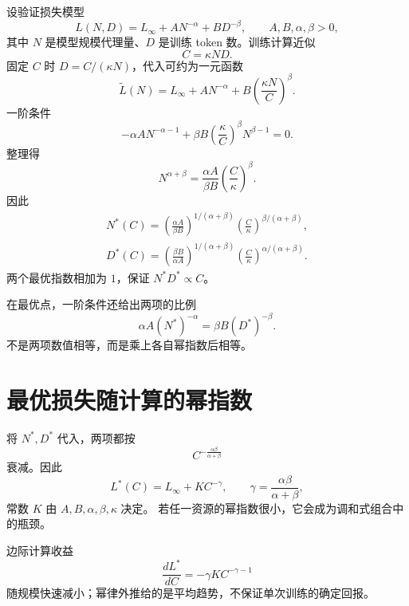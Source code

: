 \documentclass[11pt]{article}
\numberwithin{equation}{section}
\newcommand{\1}{\mathbf{1}}
\begin{document}
设验证损失模型
\begin{equation}
 L(N,D)=L_\infty+A N^{-\alpha}+B D^{-\beta},
 \qquad A,B,\alpha,\beta>0,
\end{equation}
其中 $N$ 是模型规模代理量、$D$ 是训练 token 数。训练计算近似
\begin{equation}
 C=\kappa ND.
\end{equation}
固定 $C$ 时 $D=C/(\kappa N)$，代入可约为一元函数
\begin{equation}
 \widetilde L(N)=L_\infty+A N^{-\alpha}
 +B\left(\frac{\kappa N}{C}\right)^\beta.
\end{equation}
一阶条件
\begin{equation}
 -\alpha A N^{-\alpha-1}
 +\beta B\left(\frac\kappa C\right)^\beta N^{\beta-1}=0.
\end{equation}
整理得
\begin{equation}
 N^{\alpha+\beta}
 =\frac{\alpha A}{\beta B}\left(\frac C\kappa\right)^\beta.
\end{equation}
因此
\begin{align}
 \boxed{N^*(C)=
 \left(\frac{\alpha A}{\beta B}\right)^{1/(\alpha+\beta)}
 \left(\frac C\kappa\right)^{\beta/(\alpha+\beta)},}\\
 \boxed{D^*(C)=
 \left(\frac{\beta B}{\alpha A}\right)^{1/(\alpha+\beta)}
 \left(\frac C\kappa\right)^{\alpha/(\alpha+\beta)}.}
\end{align}
两个最优指数相加为 $1$，保证 $N^*D^*\propto C$。

在最优点，一阶条件还给出两项的比例
\begin{equation}
 \alpha A(N^*)^{-\alpha}=\beta B(D^*)^{-\beta}.
\end{equation}
不是两项数值相等，而是乘上各自幂指数后相等。

\section{最优损失随计算的幂指数}

将 $N^*,D^*$ 代入，两项都按
\begin{equation}
 C^{-\frac{\alpha\beta}{\alpha+\beta}}
\end{equation}
衰减。因此
\begin{equation}
 L^*(C)=L_\infty+K C^{-\gamma},
 \qquad \gamma=\frac{\alpha\beta}{\alpha+\beta},
\end{equation}
常数 $K$ 由 $A,B,\alpha,\beta,\kappa$ 决定。
若任一资源的幂指数很小，它会成为调和式组合中的瓶颈。

边际计算收益
\begin{equation}
 \frac{dL^*}{dC}=-\gamma K C^{-\gamma-1}
\end{equation}
随规模快速减小；幂律外推给的是平均趋势，不保证单次训练的确定回报。
\end{document}
